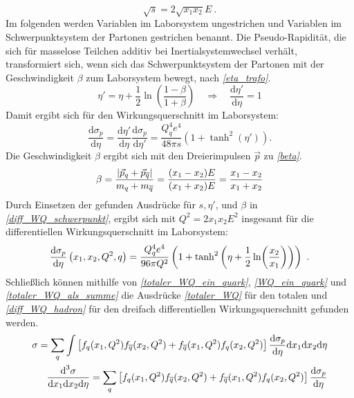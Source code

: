 \begin{equation}
\sqrt{s} = 2\sqrt{x_1x_2}E~.
\end{equation}
Im folgenden werden Variablen im Laborsystem ungestrichen und Variablen im Schwerpunktsystem der Partonen gestrichen benannt. Die Pseudo-Rapidität, die sich für masselose Teilchen additiv bei Inertialsystemwechsel verhält, transformiert sich, wenn sich das Schwerpunktsystem der Partonen mit der Geschwindigkeit $\beta$ zum Laborsystem bewegt, nach \textit{\autoref{eta_trafo}}.
\begin{equation}
\eta' = \eta + \frac{1}{2}\ln(\frac{1-\beta}{1+\beta}) \quad \Rightarrow \quad \frac{\text{d}\eta'}{\text{d}\eta} = 1 
\label{eta_trafo}
\end{equation}
Damit ergibt sich für den Wirkungsquerschnitt im Laborsystem: 
\begin{equation}
\frac{\text{d}\sigma_p}{\text{d}\eta} = \frac{\text{d}\eta'}{\text{d}\eta} \frac{\text{d}\sigma_p}{\text{d}\eta'} = \frac{Q_q^4e^4}{48\pi s}(1+\tanh^2(\eta')).
\label{diff_WQ_schwerpunkt}
\end{equation}
Die Geschwindigkeit $\beta$ ergibt sich mit den Dreierimpulsen $\vec{p}$ zu \textit{\autoref{beta}}.
\begin{equation}
\beta = \frac{\abs{\vec{p}_q + \vec{p}_{\overline{q}}}}{m_q + m_{\overline{q}}} = \frac{(x_1 - x_2)E}{(x_1 + x_2)E} = \frac{x_1 - x_2}{x_1 + x_2}
\label{beta}
\end{equation}
Durch Einsetzen der gefunden Ausdrücke für $s, \eta'$, und $\beta$ in \textit{\autoref{diff_WQ_schwerpunkt}}, ergibt sich mit $Q^2 = 2 x_1 x_2 E^2$ insgesamt für die differentiellen Wirkungsquerschnitt im Laborsystem:
\begin{equation}
\derivative{\sigma_p}{\eta}\left(x_1, x_2, Q^2, q\right) = \frac{Q_q^4e^4}{96\pi Q^2} \left(1+\tanh^2\left(\eta + \frac{1}{2}\ln(\frac{x_2}{x_1})\right)\right)~.
\label{diff_WQ_labor}
\end{equation}
Schließlich können mithilfe von \textit{\autoref{totaler_WQ_ein_quark}}, \textit{\autoref{WQ_ein_quark}} und \textit{\autoref{totaler_WQ_als_summe}} die Ausdrücke \textit{\autoref{totaler_WQ}} für den totalen und \textit{\autoref{diff_WQ_hadron}} für den dreifach differentiellen Wirkungsquerschnitt gefunden werden.
\begin{align}
\label{totaler_WQ}
\sigma = \sum_{q} \int \left[f_q(x_1, Q^2)f_{\overline{q}}(x_2, Q^2) +f_{\overline{q}}(x_1, Q^2)f_{q}(x_2, Q^2) \right] \derivative{\sigma_p}{\eta} \text{d}x_1\text{d}x_2\text{d}\eta \\
\frac{\text{d}^3\sigma}{\text{d}x_1\text{d}x_2\text{d}\eta} = \sum_{q} \left[f_q(x_1, Q^2)f_{\overline{q}}(x_2, Q^2) +f_{\overline{q}}(x_1, Q^2)f_{q}(x_2, Q^2) \right] \derivative{\sigma_p}{\eta}
\label{diff_WQ_hadron} 
\end{align}
